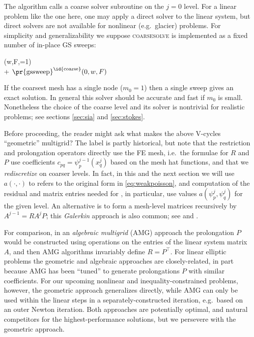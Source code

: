 \documentclass[letterpaper,final,12pt,reqno]{amsart}
\theoremstyle{claim}
\numberwithin{equation}{section}
\numberwithin{figure}{section}
\numberwithin{table}{section}
\numberwithin{theorem}{section}
\begin{document}
The algorithm calls a coarse solver subroutine on the $j=0$ level.  For a linear problem like the one here, one may apply a direct solver to the linear system, but direct solvers are not available for nonlinear (e.g.~glacier) problems.  For simplicity and generalizability we suppose \textsc{coarsesolve} is implemented as a fixed number of in-place GS sweeps:
\begin{pseudo*}
(w,F,=1)\text{:} \\+
    $\text{\pr{gssweep}}^{\text{\id{coarse}}}(0,w,F)$ \\
\end{pseudo*}
If the coarsest mesh has a single node ($m_0=1$) then a single sweep gives an exact solution.  In general this solver should be accurate and fast if $m_0$ is small.  Nonetheless the choice of the coarse level and its solver is nontrivial for realistic problems; see sections \ref{sec:sia} and \ref{sec:stokes}.

Before proceeding, the reader might ask what makes the above V-cycles ``geometric'' multigrid?  The label is partly historical, but note that the restriction and prolongation operators directly use the FE mesh, i.e.~the formulae for $R$ and $P$ use coefficients $c_{pq} = \psi_p^{j-1}(x_q^j)$ based on the mesh hat functions, and that we \emph{rediscretize} on coarser levels.  In fact, in this and the next section we will use $a(\cdot,\cdot)$ to refers to the original form in \eqref{eq:weakpoisson}, and computation of the residual and matrix entries needed for , in particular, use values $a(\psi_p^j,\psi_q^j)$ for the given level.  An alternative is to form a mesh-level matrices recursively by $A^{j-1} = R A^j P$; this \emph{Galerkin} approach is also common; see \cite{Bueler2021} and \cite[Chapter V]{Braess2007}.

For comparison, in an \emph{algebraic multigrid} (AMG) \cite{Trottenbergetal2001} approach the prolongation $P$ would be constructed using operations on the entries of the linear system matrix $A$, and then AMG algorithms invariably define $R=P^\top$.  For linear elliptic problems the geometric and algebraic approaches are closely-related, in part because AMG has been ``tuned'' to generate prolongations $P$ with similar coefficients.  For our upcoming nonlinear and inequality-constrained problems, however, the geometric approach generalizes directly, while AMG can only be used within the linear steps in a separately-constructed iteration, e.g.~based on an outer Newton iteration.  Both approaches are potentially optimal, and natural competitors for the highest-performance solutions, but we persevere with the geometric approach.
\end{document}
